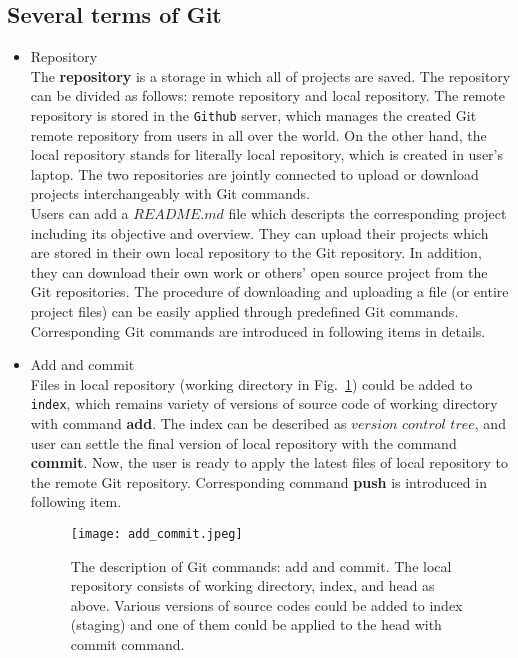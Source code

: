\documentclass{article}
\begin{document}
\subsection{Several terms of Git}
\begin{itemize}
    \item Repository \\
    \hspace*{1mm} The \textbf{repository} is a storage in which all of projects are saved. The repository can be divided as follows: remote repository and local repository. The remote repository is stored in the \texttt{Github} server, which manages the created Git remote repository from users in all over the world. On the other hand, the local repository stands for literally local repository, which is created in user's laptop. The two repositories are jointly connected to upload or download projects interchangeably with Git commands. \\ 
    \hspace*{1mm} Users can add a $README.md$ file which descripts the corresponding project including its objective and overview. They can upload their projects which are stored in their own local repository to the Git repository. In addition, they can download their own work or others' open source project from the Git repositories. The procedure of downloading and uploading a file (or entire project files) can be easily applied through predefined Git commands. Corresponding Git commands are introduced in following items in details. 
    \item Add and commit \\ 
    \hspace*{1mm} Files in local repository (working directory in Fig.~\ref{fig:add_command}) could be added to \texttt{index}, which remains variety of versions of source code of working directory with command \textbf{add}. The index can be described as $version$ $control$ $tree$, and user can settle the final version of local repository with the command \textbf{commit}. Now, the user is ready to apply the latest files of local repository to the remote Git repository. Corresponding command \textbf{push} is introduced in following item. 
    
    \begin{figure}[h!]
        \centering
        \texttt{[image: add\_commit.jpeg]}
        \caption{The description of Git commands: add and commit. The local repository consists of working directory, index, and head as above. Various versions of source codes could be added to index (staging) and one of them could be applied to the head with commit command.}
        \label{fig:add_command}
    \end{figure}
    

\end{itemize}
\end{document}
